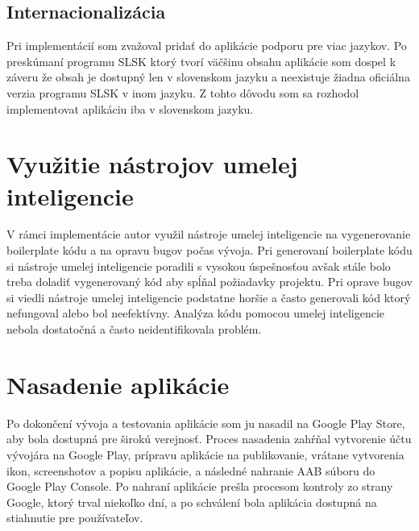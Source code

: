 \subsection{Internacionalizácia}
Pri implementácií som zvažoval pridať do aplikácie podporu pre viac jazykov. Po preskúmaní programu SLSK ktorý tvorí väčšinu obsahu aplikácie som dospel k záveru že obsah je dostupný len v slovenskom jazyku a neexistuje žiadna oficiálna verzia programu SLSK v inom jazyku. Z tohto dôvodu som sa rozhodol implementovat aplikáciu iba v slovenskom jazyku.


\section{Využitie nástrojov umelej inteligencie}
V rámci implementácie autor využil nástroje umelej inteligencie na vygenerovanie boilerplate kódu a na opravu bugov počas vývoja. Pri generovaní boilerplate kódu si nástroje umelej inteligencie poradili s vysokou úspešnosťou avšak stále bolo treba doladiť vygenerovaný kód aby spĺňal požiadavky projektu. Pri oprave bugov si viedli nástroje umelej inteligencie podstatne horšie a často generovali kód ktorý nefungoval alebo bol neefektívny. Analýza kódu pomocou umelej inteligencie nebola dostatočná a často neidentifikovala problém.

\section{Nasadenie aplikácie}
Po dokončení vývoja a testovania aplikácie som ju nasadil na Google Play Store, aby bola dostupná pre širokú verejnosť. Proces nasadenia zahŕňal vytvorenie účtu vývojára na Google Play, prípravu aplikácie na publikovanie, vrátane vytvorenia ikon, screenshotov a popisu aplikácie, a následné nahranie AAB súboru do Google Play Console. Po nahraní aplikácie prešla procesom kontroly zo strany Google, ktorý trval niekoľko dní, a po schválení bola aplikácia dostupná na stiahnutie pre používateľov.